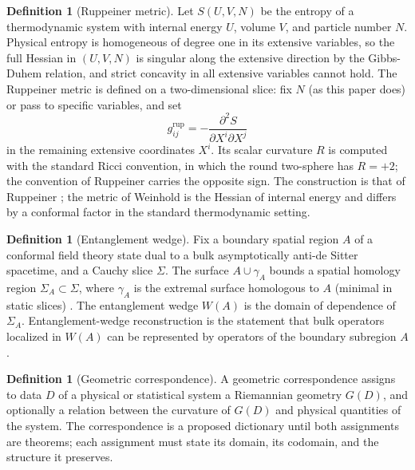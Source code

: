 \documentclass[11pt,letterpaper]{article}
\theoremstyle{definition}
\newtheorem{definition}[theorem]{Definition}
\theoremstyle{remark}
\begin{document}
\begin{definition}[Ruppeiner metric]
\label{def:ruppeiner}
Let $S(U, V, N)$ be the entropy of a thermodynamic system with internal energy $U$, volume $V$, and particle number $N$. Physical entropy is homogeneous of degree one in its extensive variables, so the full Hessian in $(U, V, N)$ is singular along the extensive direction by the Gibbs-Duhem relation, and strict concavity in all extensive variables cannot hold. The Ruppeiner metric is defined on a two-dimensional slice: fix $N$ (as this paper does) or pass to specific variables, and set
\begin{equation}
g^{\mathrm{rup}}_{ij} = -\frac{\partial^2 S}{\partial X^i \partial X^j}
\end{equation}
in the remaining extensive coordinates $X^i$. Its scalar curvature $R$ is computed with the standard Ricci convention, in which the round two-sphere has $R = +2$; the convention of Ruppeiner \cite{ruppeiner} carries the opposite sign. The construction is that of Ruppeiner \cite{ruppeiner}; the metric of Weinhold \cite{weinhold} is the Hessian of internal energy and differs by a conformal factor in the standard thermodynamic setting.
\end{definition}

\begin{definition}[Entanglement wedge]
\label{def:wedge}
Fix a boundary spatial region $A$ of a conformal field theory state dual to a bulk asymptotically anti-de Sitter spacetime, and a Cauchy slice $\Sigma$. The surface $A \cup \gamma_A$ bounds a spatial homology region $\Sigma_A \subset \Sigma$, where $\gamma_A$ is the extremal surface homologous to $A$ (minimal in static slices) \cite{hrt}. The entanglement wedge $W(A)$ is the domain of dependence of $\Sigma_A$. Entanglement-wedge reconstruction is the statement that bulk operators localized in $W(A)$ can be represented by operators of the boundary subregion $A$.
\end{definition}

\begin{definition}[Geometric correspondence]
\label{def:correspondence}
A geometric correspondence assigns to data $D$ of a physical or statistical system a Riemannian geometry $G(D)$, and optionally a relation between the curvature of $G(D)$ and physical quantities of the system. The correspondence is a proposed dictionary until both assignments are theorems; each assignment must state its domain, its codomain, and the structure it preserves.
\end{definition}
\end{document}
